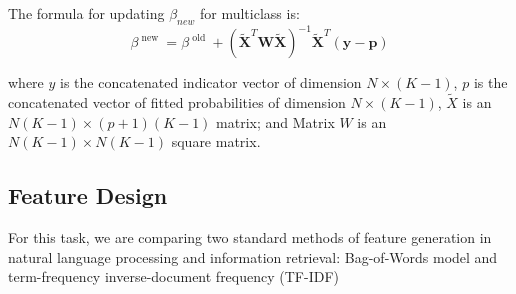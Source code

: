The formula for updating $\beta_{new}$ for multiclass is:
$$\beta ^ { \text { new } } = \beta ^ { \text { old } } + \left( \tilde { \mathbf { X } } ^ { T } \mathbf { W } \tilde { \mathbf { X } } \right) ^ { - 1 } \tilde { \mathbf { X } } ^ { T } ( \mathbf { y } - \mathbf { p } )$$

where $y$ is the concatenated indicator vector of dimension $N \times (K-1)$, $p$ is the concatenated vector of fitted probabilities of dimension $N \times (K-1)$, $\tilde{X}$ is an $N(K-1)\times (p+1)(K-1)$ matrix; and Matrix $W$ is an $N(K-1)\times N(K-1)$ square matrix.

\subsection{Feature Design}

For this task, we are comparing two standard methods of feature generation in natural language processing and information retrieval: Bag-of-Words model and term-frequency inverse-document frequency (TF-IDF)

%
%





